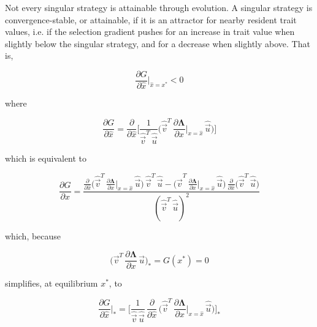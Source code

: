 Not every singular strategy is attainable through evolution. A singular strategy is convergence-stable, or attainable, if it is an attractor for nearby resident trait values, i.e. if the selection gradient pushes for an increase in trait value when slightly below the singular strategy, and for a decrease when slightly above. That is, 

\begin{equation}
    \frac{\partial G}{\partial \hat{x}}\bigg|_{\hat{x}=x^*} < 0
\end{equation}

where 

\begin{equation}
    \frac{\partial G}{\partial \hat{x}} = \frac{\partial}{\partial \hat{x}} \Bigg[ \frac{1}{\hat{\overrightarrow{v}}^T\,\hat{\overrightarrow{u}}} \bigg( \hat{\overrightarrow{v}}^T\,\frac{\partial \pmb{\Lambda}}{\partial x}\bigg|_{x=\hat{x}}\,\hat{\overrightarrow{u}} \bigg) \Bigg]
\end{equation}

which is equivalent to

\begin{equation}
    \frac{\partial G}{\partial \hat{x}} = \frac{\frac{\partial}{\partial \hat{x}} \big( \hat{\overrightarrow{v}}^T\,\frac{\partial \pmb{\Lambda}}{\partial x}\big|_{x=\hat{x}}\,\hat{\overrightarrow{u}} \big)\,\hat{\overrightarrow{v}}^T\,\hat{\overrightarrow{u}} - \big( \hat{\overrightarrow{v}}^T\,\frac{\partial \pmb{\Lambda}}{\partial x}\big|_{x=\hat{x}}\,\hat{\overrightarrow{u}} \big)\,\frac{\partial}{\partial \hat{x}} \big(\hat{\overrightarrow{v}}^T\,\hat{\overrightarrow{u}}\big)}{(\hat{\overrightarrow{v}}^T\,\hat{\overrightarrow{u}})^2}
    \label{eq:deriv_gradient}
\end{equation}

which, because

\begin{equation}
    \bigg( \overrightarrow{v}^T\,\frac{\partial \pmb \Lambda}{\partial x}\,\overrightarrow{u} \bigg)_* = G(x^*) = 0
    \label{eq:gradient_is_zero_at_equilibrium}
\end{equation}

simplifies, at equilibrium $x^*$, to

\begin{equation}
    \frac{\partial G}{\partial \hat x}\bigg|_* = \Bigg[ \frac{1}{\hat{\overrightarrow{v}}\,\hat{\overrightarrow{u}}} \, \frac{\partial}{\partial \hat x}\,\bigg(\hat{\overrightarrow{v}}^T\,\frac{\partial \pmb \Lambda}{\partial x}\bigg|_{x=\hat x}\,\hat{\overrightarrow{u}}\bigg)\Bigg]_*
    \label{eq:deriv_gradient_equilibrium}
\end{equation}

